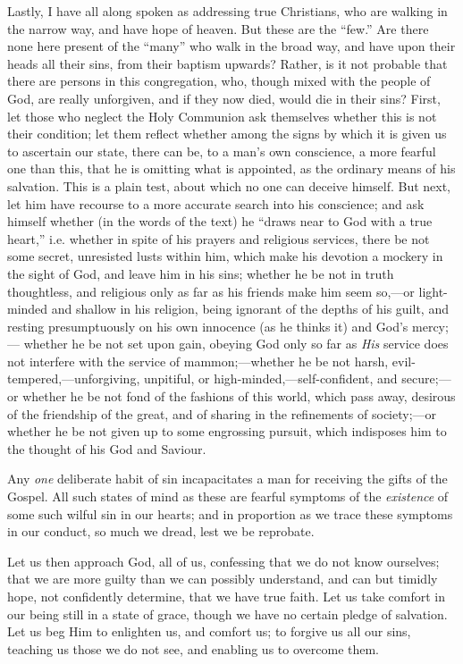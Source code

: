 Lastly, I have all along spoken as addressing true
Christians, who are walking in the narrow way, and have
hope of heaven. But these are the ``few.'' Are
there none here present of the ``many'' who walk
in the broad way, and have upon their heads all their
sins, from their baptism upwards? Rather, is it not
probable that there are persons in this congregation,
who, though mixed with the people of God, are really
unforgiven, and if they now died, would die in their
sins? First, let those who neglect the Holy Communion ask
themselves whether this is not their condition; let them
reflect whether among the signs by which it is given us
to ascertain our state, there can be, to a man's own
conscience, a more fearful one than this, that he is
omitting what is appointed, as the ordinary means of his
salvation. This is a plain test, about which no one can
deceive himself. But next, let him have recourse to a
more accurate search into his conscience; and ask himself
whether (in the words of the text) he ``draws near to
God with a true heart,'' i.e. whether in spite of his
prayers and religious services, there be not some secret,
unresisted lusts within him, which make his devotion a
mockery in the sight of God, and leave him in his sins;
whether he be not in truth thoughtless, and religious
only as far as his friends make him seem so,—or
light-minded and shallow in his religion, being ignorant
of the depths of his guilt, and resting presumptuously on
his own innocence (as he thinks it) and God's
mercy;— whether he be not set upon gain, obeying God
only so far as \emph{His} service does not interfere with
the service of mammon;—whether he be not harsh,
evil-tempered,—unforgiving, unpitiful, or
high-minded,—self-confident, and secure;—or
whether he be not fond of the fashions of this world,
which pass away, desirous of the friendship of the great,
and of sharing in the refinements of society;—or
whether he be not given up to some engrossing pursuit,
which indisposes him to the thought of his God and
Saviour.

Any \emph{one} deliberate habit of sin incapacitates a
man for receiving the gifts of the Gospel. All such
states of mind as these are fearful symptoms of the \emph{existence}
of some such wilful sin in our hearts; and in proportion
as we trace these symptoms in our conduct, so much we
dread, lest we be reprobate.

Let us then approach God, all of us, confessing that
we do not know ourselves; that we are more guilty than we
can possibly understand, and can but timidly hope, not
confidently determine, that we have true faith. Let us
take comfort in our being still in a state of grace,
though we have no certain pledge of salvation. Let us beg
Him to enlighten us, and comfort us; to forgive us all
our sins, teaching us those we do not see, and enabling
us to overcome them.

